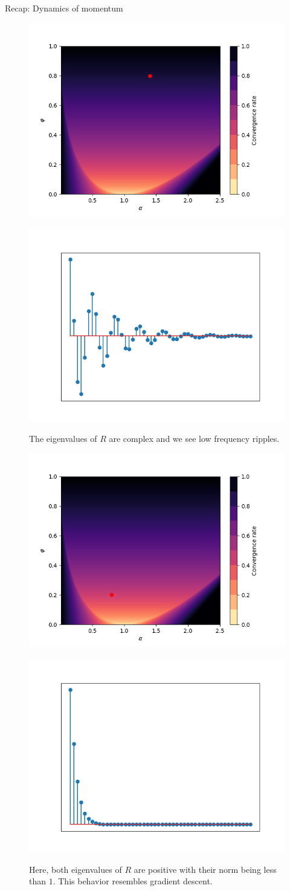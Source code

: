 \documentclass[11pt,compress,t,notes=noshow, xcolor=table]{beamer}
\begin{document}
\begin{vbframe}{Recap: Dynamics of momentum}
\framebreak
\vspace*{1.0cm}
\begin{figure}
	\includegraphics[height=0.35\textwidth, keepaspectratio]{figure_man/momentum_conv_ripples.png} ~~ \includegraphics[height=0.35\textwidth, keepaspectratio]{figure_man/momentum_ripples.png} \\
	\begin{footnotesize} 
		The eigenvalues of $R$ are complex and we see low frequency ripples. 
	\end{footnotesize}
\end{figure}

\framebreak
\vspace*{1.0cm}
\begin{figure}
	\includegraphics[height=0.35\textwidth, keepaspectratio]{figure_man/momentum_conv_mono.png} ~~ \includegraphics[height=0.35\textwidth, keepaspectratio]{figure_man/momentum_mono.png} \\
	\begin{footnotesize} 
		Here, both eigenvalues of $R$ are positive with their norm being less than $1$. This behavior resembles gradient descent. 
	\end{footnotesize}
\end{figure}


\end{vbframe}
\end{document}
